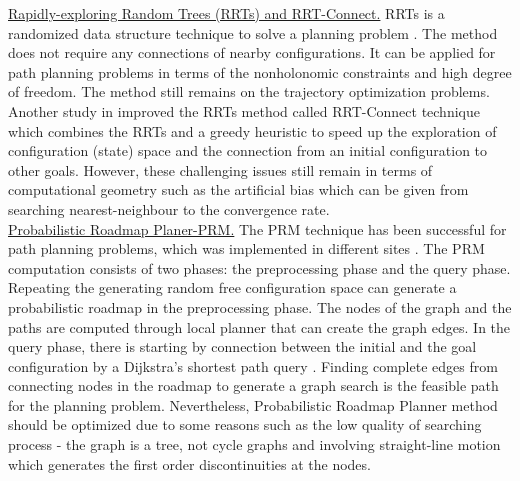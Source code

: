 \noindent\uline{Rapidly-exploring Random Trees (RRTs) and RRT-Connect.} RRTs is a randomized data structure technique to solve a planning problem \cite{Lavalle98rapidly_exploringrandom}.
The method does not require any connections of nearby configurations. It can be applied for path planning problems in terms of the nonholonomic constraints and high degree of freedom. The method still remains on the trajectory optimization problems. Another study in \cite{Kuffner00_RRTConnect} improved the RRTs method called RRT-Connect technique which combines the RRTs and a greedy heuristic to speed up the exploration of configuration (state) space and the connection from an initial configuration to other goals. However, these challenging issues still remain in terms of computational geometry such as the artificial bias which can be given from searching nearest-neighbour to the convergence rate.\\




\noindent\uline{Probabilistic Roadmap Planer-PRM.}
The PRM technique has been successful for path planning problems, which was implemented in different sites \cite{Amato96_PRM_PathPlanning, Kavraki95_Thesis_RandomNetworks_FastPlanning, Overmars92_RandomApproach_MP}. 
The PRM computation consists of two phases: the preprocessing phase and the query phase. Repeating the generating random free configuration space can generate a probabilistic roadmap in the preprocessing phase. The nodes of the graph and the paths are computed through local planner that can create the graph edges. In the query phase, there is starting by connection between the initial and the goal configuration by a Dijkstra's shortest path query \cite{Geraerts04_Comprative_PRM}. Finding complete edges from connecting nodes in the roadmap to generate a graph search is the feasible path for the planning problem. Nevertheless, Probabilistic Roadmap Planner method should be optimized due to some reasons such as the low quality of searching process - the graph is a tree, not cycle graphs and involving straight-line motion which generates the first order discontinuities at the nodes. \\




